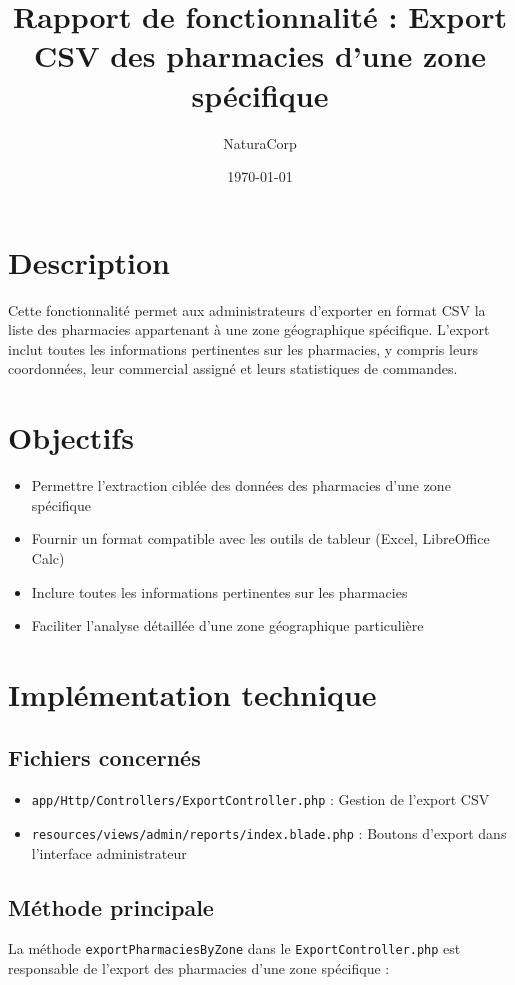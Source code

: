 \documentclass[12pt,a4paper]{article}
\title{Rapport de fonctionnalité : Export CSV des pharmacies d'une zone spécifique}
\author{NaturaCorp}
\date{\today}
\begin{document}
\maketitle

\section{Description}
Cette fonctionnalité permet aux administrateurs d'exporter en format CSV la liste des pharmacies appartenant à une zone géographique spécifique. L'export inclut toutes les informations pertinentes sur les pharmacies, y compris leurs coordonnées, leur commercial assigné et leurs statistiques de commandes.

\section{Objectifs}
\begin{itemize}
    \item Permettre l'extraction ciblée des données des pharmacies d'une zone spécifique
    \item Fournir un format compatible avec les outils de tableur (Excel, LibreOffice Calc)
    \item Inclure toutes les informations pertinentes sur les pharmacies
    \item Faciliter l'analyse détaillée d'une zone géographique particulière
\end{itemize}

\section{Implémentation technique}

\subsection{Fichiers concernés}
\begin{itemize}
    \item \texttt{app/Http/Controllers/ExportController.php} : Gestion de l'export CSV
    \item \texttt{resources/views/admin/reports/index.blade.php} : Boutons d'export dans l'interface administrateur
\end{itemize}

\subsection{Méthode principale}
La méthode \texttt{exportPharmaciesByZone} dans le \texttt{ExportController.php} est responsable de l'export des pharmacies d'une zone spécifique :
\end{document}
